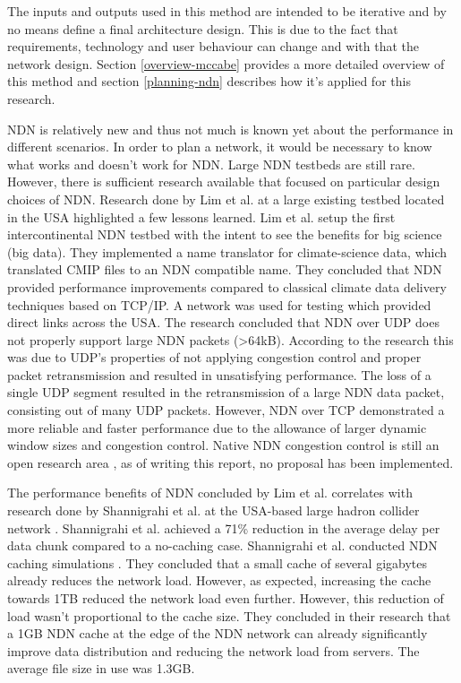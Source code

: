 The inputs and outputs used in this method are intended to be iterative and by no means define a final architecture design. This is due to the fact that requirements, technology and user behaviour can change and with that the network design. Section \ref{overview-mccabe} provides a more detailed overview of this method and section \ref{planning-ndn} describes how it's applied for this research.

NDN is relatively new and thus not much is known yet about the performance in different scenarios. In order to plan a network, it would be necessary to know what works and doesn't work for NDN. Large NDN testbeds are still rare. However, there is sufficient research available that focused on particular design choices of NDN. Research done by Lim et al. \cite{lim2018ndn} at a large existing testbed located in the USA \cite{ndn-testbed-status} highlighted a few lessons learned. Lim et al. setup the first intercontinental NDN testbed with the intent to see the benefits for big science (big data). They implemented a name translator for climate-science data, which translated CMIP files to an NDN compatible name. They concluded that NDN provided performance improvements compared to classical climate data delivery techniques based on TCP/IP. A network was used for testing which provided direct links across the USA. The research concluded that NDN over UDP does not properly support large NDN packets (\textgreater 64kB). According to the research this was due to UDP's properties of not applying congestion control and proper packet retransmission and resulted in unsatisfying performance. The loss of a single UDP segment resulted in the retransmission of a large NDN data packet, consisting out of many UDP packets. However, NDN over TCP demonstrated a more reliable and faster performance due to the allowance of larger dynamic window sizes and congestion control. Native NDN congestion control is still an open research area \cite{ren2016congestion}, as of writing this report, no proposal has been implemented.

The performance benefits of NDN concluded by Lim et al. correlates with research done by Shannigrahi et al. at the USA-based large hadron collider network \cite{shannigrahi2015named}. Shannigrahi et al. achieved a 71\% reduction in the average delay per data chunk compared to a no-caching case. Shannigrahi et al. conducted NDN caching simulations \cite{shannigrahi2017request}. They concluded that a small cache of several gigabytes already reduces the network load. However, as expected, increasing the cache towards 1TB reduced the network load even further. However, this reduction of load wasn't proportional to the cache size. They concluded in their research that a 1GB NDN cache at the edge of the NDN network can already significantly improve data distribution and reducing the network load from servers. The average file size in use was 1.3GB.

